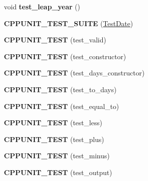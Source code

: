 \begin{DoxyCompactItemize}
\item 
\hypertarget{structTestDate_a25180210ed98e422c984b24f5365749b}{
void {\bfseries test\_\-leap\_\-year} ()}
\label{structTestDate_a25180210ed98e422c984b24f5365749b}

\item 
\hypertarget{structTestDate_acc762b0c455c57907c9086ae3bbdbe72}{
{\bfseries CPPUNIT\_\-TEST\_\-SUITE} (\hyperlink{structTestDate}{TestDate})}
\label{structTestDate_acc762b0c455c57907c9086ae3bbdbe72}

\item 
\hypertarget{structTestDate_a6b1826ecef71359e2eee2c8f98402666}{
{\bfseries CPPUNIT\_\-TEST} (test\_\-valid)}
\label{structTestDate_a6b1826ecef71359e2eee2c8f98402666}

\item 
\hypertarget{structTestDate_a8823537da70512680908df012c92f330}{
{\bfseries CPPUNIT\_\-TEST} (test\_\-constructor)}
\label{structTestDate_a8823537da70512680908df012c92f330}

\item 
\hypertarget{structTestDate_a13693852e73a215c8ae06f4d9a8daaa6}{
{\bfseries CPPUNIT\_\-TEST} (test\_\-days\_\-constructor)}
\label{structTestDate_a13693852e73a215c8ae06f4d9a8daaa6}

\item 
\hypertarget{structTestDate_a5507ee9308aaa3ee5415ba7e45533372}{
{\bfseries CPPUNIT\_\-TEST} (test\_\-to\_\-days)}
\label{structTestDate_a5507ee9308aaa3ee5415ba7e45533372}

\item 
\hypertarget{structTestDate_a807e9c5bb13bf9a0889f014c755cea17}{
{\bfseries CPPUNIT\_\-TEST} (test\_\-equal\_\-to)}
\label{structTestDate_a807e9c5bb13bf9a0889f014c755cea17}

\item 
\hypertarget{structTestDate_a48ca7d1cb4d6ab1776d5492e1c820103}{
{\bfseries CPPUNIT\_\-TEST} (test\_\-less)}
\label{structTestDate_a48ca7d1cb4d6ab1776d5492e1c820103}

\item 
\hypertarget{structTestDate_a9f9e2704a95bd065804959cc103c5880}{
{\bfseries CPPUNIT\_\-TEST} (test\_\-plus)}
\label{structTestDate_a9f9e2704a95bd065804959cc103c5880}

\item 
\hypertarget{structTestDate_aabd387cec91fadf127d88e246a209f6a}{
{\bfseries CPPUNIT\_\-TEST} (test\_\-minus)}
\label{structTestDate_aabd387cec91fadf127d88e246a209f6a}

\item 
\hypertarget{structTestDate_ab427d90e4adb5f411b7ff074659170ca}{
{\bfseries CPPUNIT\_\-TEST} (test\_\-output)}
\label{structTestDate_ab427d90e4adb5f411b7ff074659170ca}


\end{DoxyCompactItemize}
